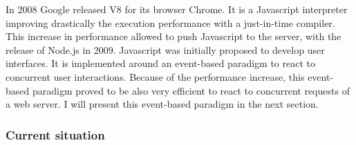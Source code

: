 In 2008 Google released V8 for its browser Chrome.
It is a Javascript interpreter improving drastically the execution performance with a just-in-time compiler.
This increase in performance allowed to push Javascript to the server, with the release of Node.js in 2009.
Javascript was initially proposed to develop user interfaces.
It is implemented around an event-based paradigm to react to concurrent user interactions.
Because of the performance increase, this event-based paradigm proved to be also very efficient to react to concurrent requests of a web server.
I will present this event-based paradigm in the next section.



\subsubsection{Current situation}


